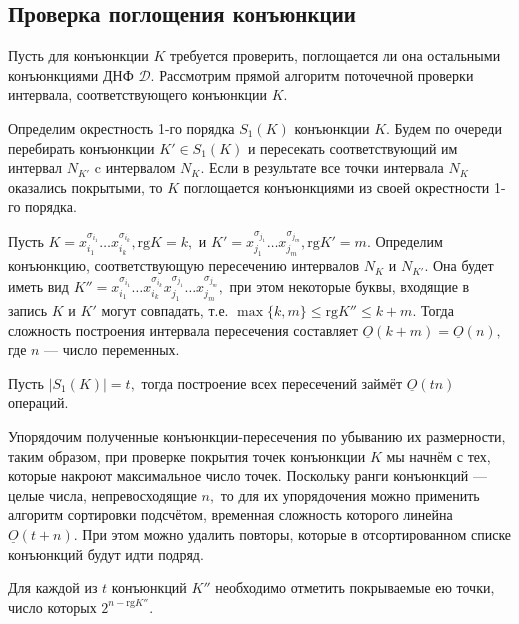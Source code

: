 \documentclass[12pt,a4paper,oneside,fleqn,leqno]{article}
\theoremstyle{definition}
\begin{document}
		\subsection{Проверка поглощения конъюнкции}
			Пусть для конъюнкции $K$ требуется проверить, поглощается ли она остальными конъюнкциями ДНФ $\mathcal{D}.$ Рассмотрим прямой алгоритм поточечной проверки интервала, соответствующего конъюнкции $K.$\par
			Определим окрестность 1-го порядка $S_1(K)$ конъюнкции $K.$ Будем по очереди перебирать конъюнкции $K' \in S_1(K)$ и пересекать соответствующий им интервал $N_{K'}$ c интервалом $N_K.$ Если в результате все точки интервала $N_K$ оказались покрытыми, то $K$ поглощается конъюнкциями из своей окрестности 1-го порядка.\par
			Пусть $K = x_{i_1}^{\sigma_{i_1}} \ldots x_{i_k}^{\sigma_{i_k}}, \text{rg}K = k,$ и $K' = x_{j_1}^{\sigma_{j_1}} \ldots x_{j_m}^{\sigma_{j_m}}, \text{rg}K' = m.$ Определим конъюнкцию, соответствующую пересечению интервалов $N_K$ и $N_{K'}.$ Она будет иметь вид $K'' = x_{i_1}^{\sigma_{i_1}} \ldots x_{i_k}^{\sigma_{i_k}} x_{j_1}^{\sigma_{j_1}} \ldots x_{j_m}^{\sigma_{j_m}},$ при этом некоторые буквы, входящие в запись $K$ и $K'$ могут совпадать, т.е. $\max\{k, m\} \leqslant \text{rg}K'' \leqslant k + m.$ Тогда сложность построения интервала пересечения составляет $\underline{O}(k + m) = \underline{O}(n),$ где $n$ --- число переменных.\par
			Пусть $|S_1(K)| = t,$ тогда построение всех пересечений займёт $\underline{O}(tn)$ операций.\par
			Упорядочим полученные конъюнкции-пересечения по убыванию их размерности, таким образом, при проверке покрытия точек конъюнкции $K$ мы начнём с тех, которые накроют максимальное число точек. Поскольку ранги конъюнкций --- целые числа, непревосходящие $n,$ то для их упорядочения можно применить алгоритм сортировки подсчётом, временная сложность которого линейна $\underline{O}(t + n).$ При этом можно удалить повторы, которые в отсортированном списке конъюнкций будут идти подряд.\par
			Для каждой из $t$ конъюнкций $K''$ необходимо отметить покрываемые ею точки, число которых $2^{n - \text{rg}K''}.$\par
\end{document}
